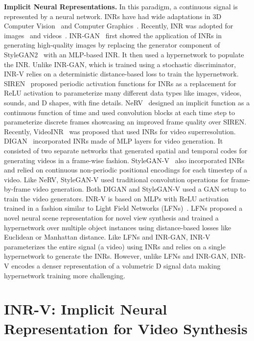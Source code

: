 \documentclass[10pt]{article} \usepackage[accepted]{tmlr}
\begin{document}
\textbf{Implicit Neural Representations.} In this paradigm, a continuous signal is represented by a neural network. 
INRs have had wide adaptations in 3D Computer Vision~\cite{deepsdf, inr1, inr2, occunet, lfns, nerf} and Computer Graphics~\cite{adnerf, dfanerf}. Recently, INR was adopted for images~\cite{inr-gan} and videos~\cite{nerv, siren, digan, videoinr}. INR-GAN~\cite{inr-gan} first showed the application of INRs in generating high-quality images by replacing the generator component of StyleGAN2~\cite{stylegan2} with an MLP-based INR. It then used a hypernetwork to populate the INR. Unlike INR-GAN, which is trained using a stochastic discriminator, INR-V relies on a deterministic distance-based loss to train the hypernetwork. SIREN~\cite{siren} proposed periodic activation functions for INRs
as a replacement for ReLU activation to parameterize many different data types like images, videos, sounds, and D shapes, with fine details. NeRV~\cite{nerv} designed an implicit function as a continuous function of time and used convolution blocks at each time step to parameterize discrete frames showcasing an improved frame quality over SIREN. Recently, VideoINR~\cite{videoinr} was proposed that used INRs for video superresolution. DIGAN~\cite{digan} incorporated INRs made of MLP layers for video generation. It consisted of two separate networks that generated spatial and temporal codes for generating videos in a frame-wise fashion. 
StyleGAN-V~\cite{stylegan-v} also incorporated INRs and relied on continuous non-periodic positional encodings for each timestep of a video.
Like NeRV, StyleGAN-V used traditional convolution operations for frame-by-frame video generation. Both DIGAN and StyleGAN-V used a GAN setup to train the video generators. INR-V is based on MLPs with ReLU activation trained in a fashion similar to Light Field Networks (LFNs)~\cite{lfns}. LFNs proposed a novel neural scene representation for novel view synthesis and trained a hypernetwork over multiple object instances using distance-based losses like Euclidean or Manhattan distance. Like LFNs and INR-GAN, INR-V parameterizes the entire signal (a video) using INRs and relies on a single hypernetwork to generate the INRs. 
However, unlike LFNs and INR-GAN, INR-V encodes a denser representation of a volumetric D signal  data making hypernetwork training more challenging.

\section{INR-V: Implicit Neural Representation for Video Synthesis}
\end{document}
